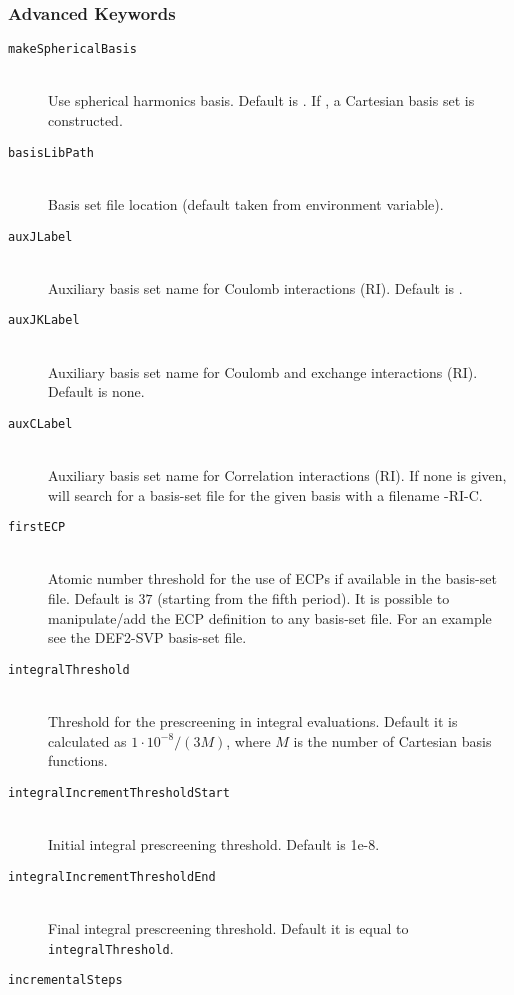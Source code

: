 \subsubsection{Advanced Keywords}
\begin{description}
    \item [\texttt{makeSphericalBasis}]\hfill \\
    Use spherical harmonics basis. Default is . If , a Cartesian basis set is constructed.
    \item [\texttt{basisLibPath}]\hfill \\
    Basis set file location (default taken from environment variable).
    \item [\texttt{auxJLabel}]\hfill \\
    Auxiliary basis set name for Coulomb interactions (RI). Default is .
    \item [\texttt{auxJKLabel}]\hfill \\
    Auxiliary basis set name for Coulomb and exchange interactions (RI). Default is none.
    \item [\texttt{auxCLabel}]\hfill \\
    Auxiliary basis set name for Correlation interactions (RI). If none is given, \serenity will search for a
    basis-set file for the given basis with a filename -RI-C.
    \item [\texttt{firstECP}]\hfill \\
    Atomic number threshold for the use of ECPs if available in the basis-set file. Default is $37$ (starting from the fifth period).
    It is possible to manipulate/add the ECP definition to any basis-set file. For an example see the DEF2-SVP basis-set file.
    \item [\texttt{integralThreshold}]\hfill \\
    Threshold for the prescreening in integral evaluations. Default it is calculated as $1\cdot 10^{-8}/(3 M)$, where $M$ is
    the number of Cartesian basis functions.
    \item [\texttt{integralIncrementThresholdStart}]\hfill \\
    Initial integral prescreening threshold. Default is 1e-8.
    \item [\texttt{integralIncrementThresholdEnd}]\hfill \\
    Final integral prescreening threshold. Default it is equal to \texttt{integralThreshold}.
    \item [\texttt{incrementalSteps}]\hfill \\

\end{description}
